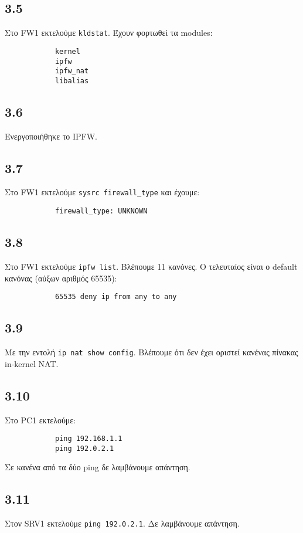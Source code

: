 \documentclass[a4paper, 12pt]{article}
\begin{document}
	\subsection*{3.5}
		Στο FW1 εκτελούμε \verb|kldstat|. Έχουν φορτωθεί τα modules:
		
		\begin{verbatim}
			kernel
			ipfw
			ipfw_nat
			libalias
		\end{verbatim}

	\subsection*{3.6}
		Ενεργοποιήθηκε το IPFW.

	\subsection*{3.7}
		Στο FW1 εκτελούμε \verb|sysrc firewall_type| και έχουμε:
		
		\begin{verbatim}
			firewall_type: UNKNOWN
		\end{verbatim}

	\subsection*{3.8}
		Στο FW1 εκτελούμε \verb|ipfw list|. Βλέπουμε 11 κανόνες. Ο τελευταίος είναι ο default κανόνας (αύξων αριθμός 65535):
		
		\begin{verbatim}
			65535 deny ip from any to any
		\end{verbatim}

	\subsection*{3.9}
		Με την εντολή \verb|ip nat show config|. Βλέπουμε ότι δεν έχει οριστεί κανένας πίνακας in-kernel NAT.

	\subsection*{3.10}
		Στο PC1 εκτελούμε:
		
		\begin{verbatim}
			ping 192.168.1.1
			ping 192.0.2.1
		\end{verbatim}
		
		Σε κανένα από τα δύο ping δε λαμβάνουμε απάντηση.

	\subsection*{3.11}
		Στον SRV1 εκτελούμε \verb|ping 192.0.2.1|. Δε λαμβάνουμε απάντηση.
\end{document}
